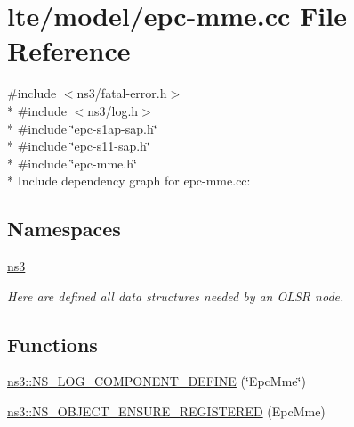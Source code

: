\hypertarget{epc-mme_8cc}{}\section{lte/model/epc-\/mme.cc File Reference}
\label{epc-mme_8cc}
{\ttfamily \#include $<$ns3/fatal-\/error.\+h$>$}\\*
{\ttfamily \#include $<$ns3/log.\+h$>$}\\*
{\ttfamily \#include \char`\"{}epc-\/s1ap-\/sap.\+h\char`\"{}}\\*
{\ttfamily \#include \char`\"{}epc-\/s11-\/sap.\+h\char`\"{}}\\*
{\ttfamily \#include \char`\"{}epc-\/mme.\+h\char`\"{}}\\*
Include dependency graph for epc-\/mme.cc\+:
\subsection*{Namespaces}
\begin{DoxyCompactItemize}
\item 
 \hyperlink{namespacens3}{ns3}
\begin{DoxyCompactList}\small\item\em Here are defined all data structures needed by an O\+L\+SR node. \end{DoxyCompactList}\end{DoxyCompactItemize}
\subsection*{Functions}
\begin{DoxyCompactItemize}
\item 
\hyperlink{namespacens3_ae57e4fa85d1aa2996b8b71d91d14dec1}{ns3\+::\+N\+S\+\_\+\+L\+O\+G\+\_\+\+C\+O\+M\+P\+O\+N\+E\+N\+T\+\_\+\+D\+E\+F\+I\+NE} (\char`\"{}Epc\+Mme\char`\"{})
\item 
\hyperlink{namespacens3_a128e18c22ccd08ea0199d0bfde782147}{ns3\+::\+N\+S\+\_\+\+O\+B\+J\+E\+C\+T\+\_\+\+E\+N\+S\+U\+R\+E\+\_\+\+R\+E\+G\+I\+S\+T\+E\+R\+ED} (Epc\+Mme)
\end{DoxyCompactItemize}
